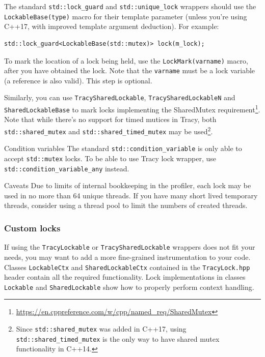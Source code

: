 \documentclass[hidelinks,titlepage,a4paper]{article}
\begin{document}
The standard \texttt{std::lock\_guard} and \texttt{std::unique\_lock} wrappers should use the \texttt{LockableBase(type)} macro for their template parameter (unless you're using C++17, with improved template argument deduction). For example:

\begin{lstlisting}
std::lock_guard<LockableBase(std::mutex)> lock(m_lock);
\end{lstlisting}

To mark the location of a lock being held, use the \texttt{LockMark(varname)} macro, after you have obtained the lock. Note that the \texttt{varname} must be a lock variable (a reference is also valid). This step is optional.

Similarly, you can use \texttt{TracySharedLockable}, \texttt{TracySharedLockableN} and \texttt{SharedLockableBase} to mark locks implementing the SharedMutex requirement\footnote{\url{https://en.cppreference.com/w/cpp/named_req/SharedMutex}}. Note that while there's no support for timed mutices in Tracy, both \texttt{std::shared\_mutex} and \texttt{std::shared\_timed\_mutex} may be used\footnote{Since \texttt{std::shared\_mutex} was added in C++17, using \texttt{std::shared\_timed\_mutex} is the only way to have shared mutex functionality in C++14.}.

\begin{bclogo}[
noborder=true,
couleur=black!5,
logo=\bclampe
]{Condition variables}
The standard \texttt{std::condition\_variable} is only able to accept \texttt{std::mutex} locks. To be able to use Tracy lock wrapper, use \texttt{std::condition\_variable\_any} instead.
\end{bclogo}

\begin{bclogo}[
noborder=true,
couleur=black!5,
logo=\bcattention
]{Caveats}
Due to limits of internal bookkeeping in the profiler, each lock may be used in no more than 64 unique threads. If you have many short lived temporary threads, consider using a thread pool to limit the numbers of created threads.
\end{bclogo}

\subsubsection{Custom locks}

If using the \texttt{TracyLockable} or \texttt{TracySharedLockable} wrappers does not fit your needs, you may want to add a more fine-grained instrumentation to your code. Classes \texttt{LockableCtx} and \texttt{SharedLockableCtx} contained in the \texttt{TracyLock.hpp} header contain all the required functionality. Lock implementations in classes \texttt{Lockable} and \texttt{SharedLockable} show how to properly perform context handling.
\end{document}
